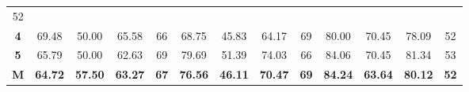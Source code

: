 \begin{table}[H]
{\begin{tabular}{ccccccccccccc}
			\multicolumn{1}{c|}{52} \\ \cline{2-13} 
			\multicolumn{1}{c|}{\cellcolor[HTML]{D9D9D9}\textbf{4}} &
			\multicolumn{1}{c|}{69.48} &
			\multicolumn{1}{c|}{50.00} &
			\multicolumn{1}{c|}{65.58} &
			\multicolumn{1}{c|}{66} &
			\multicolumn{1}{c|}{68.75} &
			\multicolumn{1}{c|}{45.83} &
			\multicolumn{1}{c|}{64.17} &
			\multicolumn{1}{c|}{69} &
			\multicolumn{1}{c|}{80.00} &
			\multicolumn{1}{c|}{70.45} &
			\multicolumn{1}{c|}{78.09} &
			\multicolumn{1}{c|}{52} \\ \cline{2-13} 
			\multicolumn{1}{c|}{\cellcolor[HTML]{D9D9D9}\textbf{5}} &
			\multicolumn{1}{c|}{65.79} &
			\multicolumn{1}{c|}{50.00} &
			\multicolumn{1}{c|}{62.63} &
			\multicolumn{1}{c|}{69} &
			\multicolumn{1}{c|}{79.69} &
			\multicolumn{1}{c|}{51.39} &
			\multicolumn{1}{c|}{74.03} &
			\multicolumn{1}{c|}{66} &
			\multicolumn{1}{c|}{84.06} &
			\multicolumn{1}{c|}{70.45} &
			\multicolumn{1}{c|}{81.34} &
			\multicolumn{1}{c|}{53} \\ \cline{2-13} 
			\multicolumn{1}{c|}{\cellcolor[HTML]{FFFF00}\textbf{M}} &
			\multicolumn{1}{c|}{\textbf{64.72}} &
			\multicolumn{1}{c|}{\textbf{57.50}} &
			\multicolumn{1}{c|}{\textbf{63.27}} &
			\multicolumn{1}{c|}{\textbf{67}} &
			\multicolumn{1}{c|}{\textbf{76.56}} &
			\multicolumn{1}{c|}{\textbf{46.11}} &
			\multicolumn{1}{c|}{\textbf{70.47}} &
			\multicolumn{1}{c|}{\textbf{69}} &
			\multicolumn{1}{c|}{\textbf{84.24}} &
			\multicolumn{1}{c|}{\textbf{63.64}} &
			\multicolumn{1}{c|}{\textbf{80.12}} &
			\multicolumn{1}{c|}{\textbf{52}} \\ \cline{2-13} 
		\end{tabular}%
	}
\end{table}